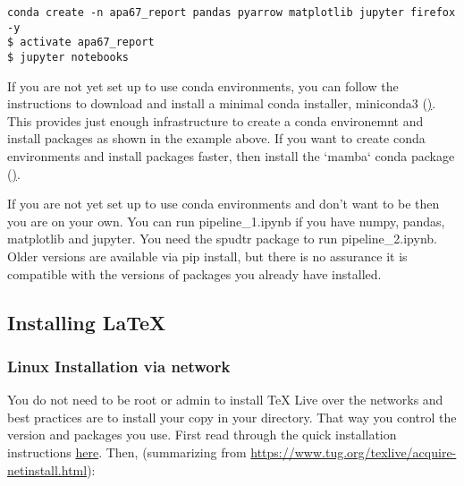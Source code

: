 \documentclass[letter,doc,natbib,11pt]{apa7}  %
\begin{document}
\begin{verbatim}
conda create -n apa67_report pandas pyarrow matplotlib jupyter firefox -y
$ activate apa67_report
$ jupyter notebooks
\end{verbatim}

If you are not yet set up to use conda environments, you can follow
the instructions to download and install a minimal conda installer,
miniconda3
(\href{https://docs.conda.io/en/latest/miniconda.html}). This provides
just enough infrastructure to create a conda environemnt and install
packages as shown in the example above. If you want to create conda
environments and install packages faster, then install the `mamba`
conda package (\href{https://mamba.readthedocs.io/en/latest/}).

If you are not yet set up to use conda environments and don't want to
be then you are on your own. You can run pipeline\_1.ipynb if you have
numpy, pandas, matplotlib and jupyter.  You need the spudtr package to
run pipeline\_2.ipynb. Older versions are available via pip install,
but there is no assurance it is compatible with the versions of
packages you already have installed.

\subsection{Installing \LaTeX}

\subsubsection{Linux Installation via network}

You do not need to be root or admin to install TeX Live over the
networks and best practices are to install your copy in your
directory. That way you control the version and packages you
use. First read through the quick installation instructions
\href{https://www.tug.org/texlive/quickinstall.html}{here}. Then,
(summarizing from
\url{https://www.tug.org/texlive/acquire-netinstall.html}):
\end{document}
